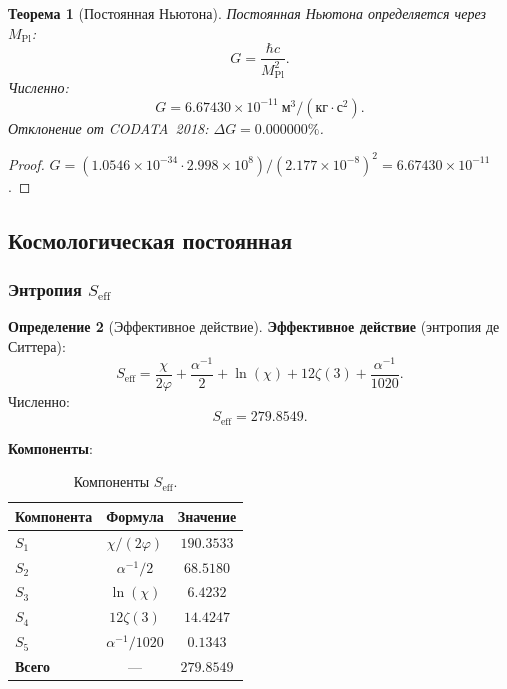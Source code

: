 \documentclass[11pt,a4paper]{article}
\newtheorem{theorem}{Теорема}[section]
\theoremstyle{definition}
\newtheorem{definition}[theorem]{Определение}
\begin{document}
\begin{theorem}[Постоянная Ньютона]
\label{thm:qg-newton}
Постоянная Ньютона определяется через $M_{\text{Pl}}$:
\begin{equation}
    \boxed{
    G = \frac{\hbar c}{M_{\text{Pl}}^2}.
    }
    \label{eq:qg-newton}
\end{equation}
Численно:
\begin{equation}
    G = 6.67430 \times 10^{-11}~\text{м}^3/(\text{кг} \cdot \text{с}^2).
\end{equation}
Отклонение от CODATA~2018: $\Delta G = 0.000000\%$.
\end{theorem}

\begin{proof}
$G = (1.0546 \times 10^{-34} \cdot 2.998 \times 10^8)
/ (2.177 \times 10^{-8})^2 = 6.67430 \times 10^{-11}$.
\end{proof}

\subsection{Космологическая постоянная}
\label{subsec:qg-lambda}

\subsubsection{Энтропия \texorpdfstring{$S_{\text{eff}}$}{}}

\begin{definition}[Эффективное действие]
\label{def:qg-s-eff}
\textbf{Эффективное действие} (энтропия де Ситтера):
\begin{equation}
    \boxed{
    S_{\text{eff}} = \frac{\chi}{2\varphi}
    + \frac{\alpha^{-1}}{2} + \ln(\chi)
    + 12 \zeta(3) + \frac{\alpha^{-1}}{1020}.
    }
    \label{eq:qg-s-eff}
\end{equation}
Численно:
\begin{equation}
    S_{\text{eff}} = 279.8549.
\end{equation}
\end{definition}

\medskip\noindent
\textbf{Компоненты}:
\begin{table}[ht]
\centering
\caption{Компоненты $S_{\text{eff}}$.}
\label{tab:qg-s-eff}
\begin{tabular}{lcc}
\toprule
Компонента & Формула & Значение \\
\midrule
$S_1$ & $\chi/(2\varphi)$ & $190.3533$ \\
$S_2$ & $\alpha^{-1}/2$ & $68.5180$ \\
$S_3$ & $\ln(\chi)$ & $6.4232$ \\
$S_4$ & $12 \zeta(3)$ & $14.4247$ \\
$S_5$ & $\alpha^{-1}/1020$ & $0.1343$ \\
\midrule
\textbf{Всего} & --- & $\mathbf{279.8549}$ \\
\bottomrule
\end{tabular}
\end{table}
\end{document}

